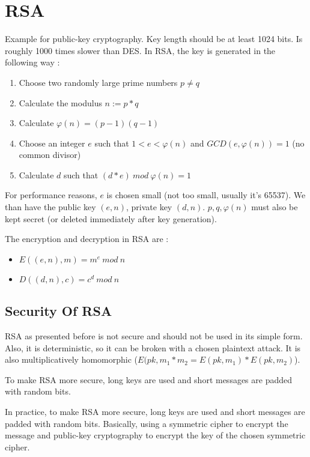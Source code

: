 \section{RSA}

Example for public-key cryptography. Key length should be at least 1024 bits. Is roughly 1000 times slower than DES. In RSA, the key is generated in the following way :
\begin{enumerate}
    \item Choose two randomly large prime numbers $p \neq q$
    \item Calculate the modulus $n := p * q$
    \item Calculate $\varphi(n) = (p-1)(q-1)$
    \item Choose an integer $e$ such that $1 < e < \varphi(n)$ and $GCD(e, \varphi(n)) = 1$ (no common divisor)
    \item Calculate $d$ such that $(d * e)\ mod\ \varphi(n) = 1$
\end{enumerate}

For performance reasons, $e$ is chosen small (not too small, usually it's 65537). We than have the public key $(e, n)$, private key $(d, n)$. $p, q, \varphi(n)$ must also be kept secret (or deleted immediately after key generation).

The encryption and decryption in RSA are :
\begin{itemize}
    \item $E((e, n), m) = m^e\ mod\ n$
    \item $D((d, n), c) = c^d\ mod\ n$
\end{itemize}

\subsection{Security Of RSA}

RSA as presented before is not secure and should not be used in its simple form. Also, it is deterministic, so it can be broken with a chosen plaintext attack. It is also multiplicatively homomorphic ($E(pk, m_1 * m_2 = E(pk, m_1) * E(pk, m_2)$).

To make RSA more secure, long keys are used and short messages are padded with random bits.

In practice, to make RSA more secure,  long keys are used and short messages are padded with random bits. Basically, using a symmetric cipher to encrypt the message and public-key cryptography to encrypt the key of the chosen symmetric cipher.


